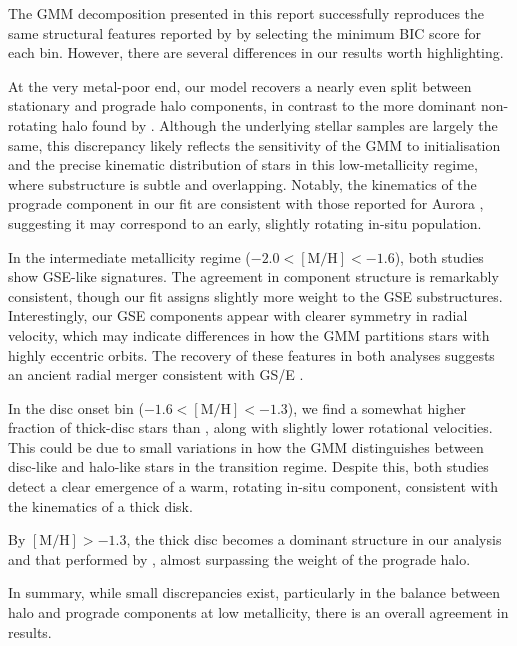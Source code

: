 \documentclass[a4paper,12pt]{article}
\begin{document}
The GMM decomposition presented in this report successfully reproduces the same structural features reported 
by \citet{zhang2024existencemetalpoordiscmilky} by selecting the minimum BIC score for each bin. However, there 
are several differences in our results worth highlighting.

At the very metal-poor end, our model recovers a nearly even split between stationary and prograde halo 
components, in contrast to the more dominant non-rotating halo found by \citet{zhang2024existencemetalpoordiscmilky}. 
Although the underlying stellar samples are largely the same, this discrepancy likely reflects the 
sensitivity of the GMM to initialisation and the precise kinematic distribution of stars in this 
low-metallicity regime, where substructure is subtle and overlapping. Notably, the kinematics of the 
prograde component in our fit are consistent with those reported for Aurora \citep{Belokurov2022}, 
suggesting it may correspond to an early, slightly rotating in-situ population.

In the intermediate metallicity regime ($-2.0 < \mathrm{[M/H]} < -1.6$), both studies show GSE-like 
signatures. The agreement in component structure is remarkably consistent, though our fit assigns slightly 
more weight to the GSE substructures. Interestingly, our GSE components appear with clearer symmetry in radial 
velocity, which may indicate differences in how the GMM partitions stars with highly eccentric orbits. 
The recovery of these features in both analyses suggests an ancient radial merger consistent with GS/E \citep{Belokurov2020}.

In the disc onset bin ($-1.6 < \mathrm{[M/H]} < -1.3$), we find a somewhat higher fraction of 
thick-disc stars than \citet{zhang2024existencemetalpoordiscmilky}, along with slightly lower rotational 
velocities. This could be due to small variations in how the GMM distinguishes between disc-like and 
halo-like stars in the transition regime. Despite this, both studies detect a clear emergence of a warm, 
rotating in-situ component, consistent with the kinematics of a thick disk.

By $[\mathrm{M/H}] > -1.3$, the thick disc becomes a dominant structure in our analysis and that performed
by \citet{zhang2024existencemetalpoordiscmilky}, almost surpassing the weight of the prograde halo.

In summary, while small discrepancies exist, particularly in the balance between halo and prograde components 
at low metallicity, there is an overall agreement in results.
\end{document}
